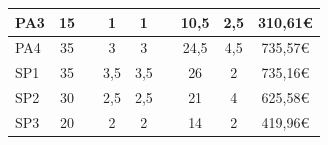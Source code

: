 \documentclass[a4paper]{article}
\begin{document}
\begin{table}[H]
\begin{center}
\begin{tabular}{|l|c|c|c|c|c|c|c|c|}
            {\color[HTML]{000000} PA3}                                                             & {\color[HTML]{000000} 15}                                                               & {\color[HTML]{000000} }                   & {\color[HTML]{000000} 1}                & {\color[HTML]{000000} 1}             & {\color[HTML]{000000} }                 & {\color[HTML]{000000} 10,5}               & {\color[HTML]{000000} 2,5}              & {\color[HTML]{000000} 310,61€}             \\ \hline
            {\color[HTML]{000000} PA4}                                                             & {\color[HTML]{000000} 35}                                                               & {\color[HTML]{000000} }                   & {\color[HTML]{000000} 3}                & {\color[HTML]{000000} 3}             & {\color[HTML]{000000} }                 & {\color[HTML]{000000} 24,5}               & {\color[HTML]{000000} 4,5}              & {\color[HTML]{000000} 735,57€}             \\ \hline
            {\color[HTML]{000000} SP1}                                                             & {\color[HTML]{000000} 35}                                                               & {\color[HTML]{000000} }                   & {\color[HTML]{000000} 3,5}              & {\color[HTML]{000000} 3,5}           & {\color[HTML]{000000} }                 & {\color[HTML]{000000} 26}                 & {\color[HTML]{000000} 2}                & {\color[HTML]{000000} 735,16€}             \\ \hline
            {\color[HTML]{000000} SP2}                                                             & {\color[HTML]{000000} 30}                                                               & {\color[HTML]{000000} }                   & {\color[HTML]{000000} 2,5}              & {\color[HTML]{000000} 2,5}           & {\color[HTML]{000000} }                 & {\color[HTML]{000000} 21}                 & {\color[HTML]{000000} 4}                & {\color[HTML]{000000} 625,58€}             \\ \hline
            {\color[HTML]{000000} SP3}                                                             & {\color[HTML]{000000} 20}                                                               & {\color[HTML]{000000} }                   & {\color[HTML]{000000} 2}                & {\color[HTML]{000000} 2}             & {\color[HTML]{000000} }                 & {\color[HTML]{000000} 14}                 & {\color[HTML]{000000} 2}                & {\color[HTML]{000000} 419,96€}             \\ \hline

\end{tabular}
\end{center}
\end{table}
\end{document}
